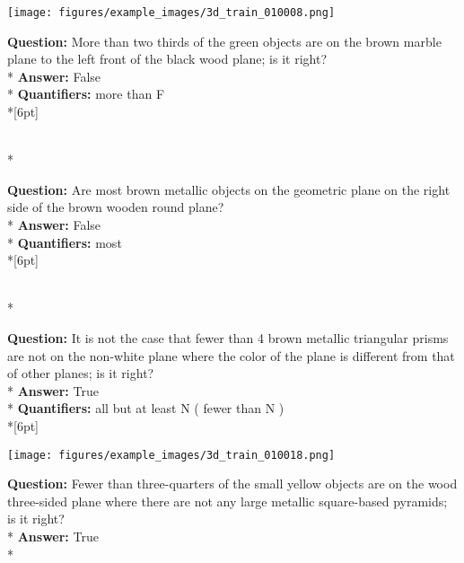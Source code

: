 \begin{figure*}  
\begin{minipage}{0.48\textwidth}
    \texttt{[image: figures/example\_images/3d\_train\_010008.png]}
    \begin{minipage}[t][2.2cm][t]{1\textwidth}
      \footnotesize
      \textbf{Question:} More than two thirds of the green objects are on the brown marble plane to the left front of the black wood plane; is it right? \\*
      \textbf{Answer:} False \\*
      \textbf{Quantifiers:} more than F \\*[6pt]
    \end{minipage}\\*
    \begin{minipage}[t][2.2cm][t]{1\textwidth}
      \footnotesize
      \textbf{Question:} Are most brown metallic objects on the geometric plane on the right side of the brown wooden round plane? \\*
      \textbf{Answer:} False \\*
      \textbf{Quantifiers:} most  \\*[6pt]
    \end{minipage}\\*
    \begin{minipage}[t][2.2cm][t]{1\textwidth}
      \footnotesize
      \textbf{Question:} It is not the case that fewer than 4 brown metallic triangular prisms are not on the non-white plane where the color of the plane is different from that of other planes; is it right? \\*
      \textbf{Answer:} True \\*
      \textbf{Quantifiers:} all but at least N ( fewer than N ) \\*[6pt]
    \end{minipage}
  \end{minipage}
  \hspace{3.5mm}
  \begin{minipage}{0.48\textwidth}
    \texttt{[image: figures/example\_images/3d\_train\_010018.png]}
    \begin{minipage}[t][2.2cm][t]{1\textwidth}
      \footnotesize
      \textbf{Question:} Fewer than three-quarters of the small yellow objects are on the wood three-sided plane where there are not any large metallic square-based pyramids; is it right? \\*
      \textbf{Answer:} True \\*

\end{minipage}
\end{minipage}
\end{figure*}
